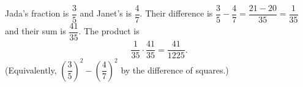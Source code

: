 Jada's fraction is $\dfrac35$ and Janet's is $\dfrac47$. Their difference is $\dfrac35-\dfrac47=\dfrac{21-20}{35}=\dfrac1{35}$ and their sum is $\dfrac{41}{35}$. The product is
\[\dfrac1{35}\cdot\dfrac{41}{35}=\boxed{\dfrac{41}{1225}}.\]
(Equivalently, $\left(\dfrac35\right)^2-\left(\dfrac47\right)^2$ by the difference of squares.)
